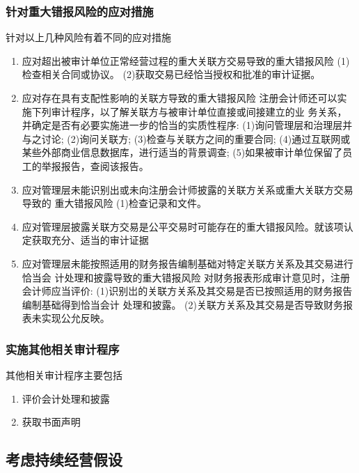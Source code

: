 \documentclass[UTF8,12pt]{ctexart}
\numberwithin{equation}{section} %
\numberwithin{figure}{section}
\numberwithin{table}{section}
\begin{document}
	\subsubsection{针对重大错报风险的应对措施}
	针对以上几种风险有着不同的应对措施
	\begin{enumerate}
		\item 应对超出被审计单位正常经营过程的重大关联方交易导致的重大错报风险 (1)检查相关合同或协议。
		 (2)获取交易已经恰当授权和批准的审计证据。
		
		\item 应对存在具有支配性影响的关联方导致的重大错报风险
		注册会计师还可以实施下列审计程序，以了解关联方与被审计单位直接或间接建立的业 务关系，并确定是否有必要实施进一步的恰当的实质性程序:
		(1)询问管理层和治理层并与之讨论;
		(2)询问关联方;
		(3)检查与关联方之间的重要合同; (4)通过互联网或某些外部商业信息数据库，进行适当的背景调查; (5)如果被审计单位保留了员工的举报报告，查阅该报告。
		
		
		\item 应对管理层未能识别出或未向注册会计师披露的关联方关系或重大关联方交易导致的
		重大错报风险
		(1)检查记录和文件。
		
		\item 应对管理层披露关联方交易是公平交易时可能存在的重大错报风险。就该项认定获取充分、适当的审计证据
		
		\item 应对管理层未能按照适用的财务报告编制基础对特定关联方关系及其交易进行恰当会 计处理和披露导致的重大错报风险
		对财务报表形成审计意见时，注册会计师应当评价:
		(1)识别岀的关联方关系及其交易是否已按照适用的财务报告编制基础得到恰当会计 处理和披露。
		(2)关联方关系及其交易是否导致财务报表未实现公允反映。
	\end{enumerate}
	
	\subsubsection{实施其他相关审计程序}
	其他相关审计程序主要包括
	\begin{enumerate}
		\item 评价会计处理和披露
		
		\item 获取书面声明
	\end{enumerate}
	
	\subsection{考虑持续经营假设}
	
\end{document}
